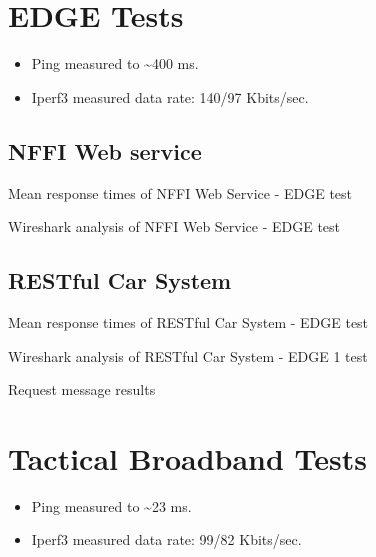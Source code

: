 \begin{appendices}
\section{EDGE Tests}

\begin{itemize}
	\item Ping measured to \textasciitilde 400 ms.
	\item Iperf3 measured data rate: 140/97 Kbits/sec.
\end{itemize}

\subsection{NFFI Web service}

\begin{table}[H]

\caption{Mean response times of NFFI Web Service - EDGE test}
\end{table}

\begin{table}[H]

\caption{Wireshark analysis of NFFI Web Service - EDGE test}
\end{table}

\subsection{RESTful Car System}

\begin{table}[H]

\caption{Mean response times of RESTful Car System - EDGE test}
\end{table}

\begin{table}[H]

\caption{Wireshark analysis of RESTful Car System - EDGE 1 test}
\end{table}

\begin{table}[H]

\caption{Request message results}
\end{table}



\section{Tactical Broadband Tests}

\begin{itemize}
	\item Ping measured to \textasciitilde 23 ms.
	\item Iperf3 measured data rate: 99/82 Kbits/sec.
\end{itemize}


\end{appendices}

